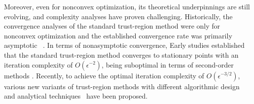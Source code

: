 \documentclass{article}
\theoremstyle{plain}
\theoremstyle{definition}
\theoremstyle{remark}
\begin{document}
Moreover, even for nonconvex optimization, its theoretical underpinnings are still evolving, and complexity analyses have proven challenging.
Historically, the convergence analyses of the standard trust-region method were only for nonconvex optimization and the established convergence rate was primarily asymptotic ~\cite{conn2000trust, yuan2015recent}. In terms of nonasymptotic convergence, Early studies established that the standard trust-region method \cite{nocedal1999numerical,conn2000trust,cartisComplexitySteepestDescent2010,cartisComplexityBoundsSecondorder2012} converges to stationary points with an iteration complexity of $O(\epsilon^{-2})$, being suboptimal in terms of second-order methods \cite{carmon2021lower}. Recently, to achieve the optimal iteration complexity of $O(\epsilon^{-3/2})$, various new variants of trust-region methods with different algorithmic design and analytical techniques~\cite{luenberger_linear_2021, curtis2017trust, curtis2021trust, hamad2022consistently, hamad2024simplepracticaladaptivetrustregion} have been proposed.
\end{document}
